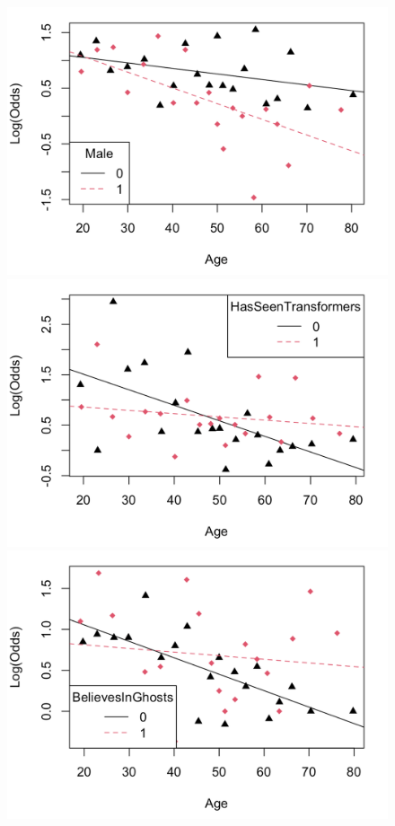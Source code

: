 \begin{figure}[!h]
    \centering
    \includegraphics[scale=.3]{intxplot_age_male.png}
    \includegraphics[scale=.3]{intxplot_age_transformers.png}
    \includegraphics[scale=.3]{intxplot_age_ghosts.png}

\end{figure}
